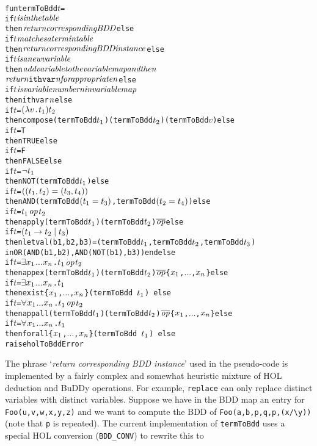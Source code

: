 \documentclass[12pt]{article}
\newcommand{\bnind}[1]{\index[MLbn]{#1}}
\renewcommand{\t}[1]{\mbox{\tt #1}}
\newcommand{\ml}[1]{{\tt #1}}
\newcommand\HOL{HOL\xspace}
\newcommand{\Buddy}{BuDDy\xspace}
\newcommand{\cond}{\rightarrow}
\newcommand{\els}{\mid}
\newcommand{\SP}{~}
\begin{document}
\newpage
{\small\baselineskip12pt\bnind{\ml{termToBdd}}\begin{alltt}
 fun termToBdd \(t\) = 
  if \(t\) \({\it{is in the table}}\)
   then \({\it{return corresponding BDD}}\) else
  if \(t\) \({\it{matches a term in table}}\) 
   then \({\it{return corresponding BDD instance}}\) else 
  if \(t\) \({\it{is a new variable}}\)
   then \({\it{add variable to the variable map and then}}\)
        \({\it{return \t{ithvar} n for appropriate n}}\) else 
  if \(t\) \({\it{is variable number n in variable map}}\)
   then ithvar \({\it{n}}\) else 
  if \(t\) = \(({\lambda}v\t{.} t\sb{1})t\sb{2}\)
   then compose (termToBdd \(t\sb{1}\)) (termToBdd \(t\sb{2}\)) (termToBdd \(v\)) else
  if \(t\) = T
   then TRUE else
  if \(t\) = F
   then FALSE else
  if \(t\) = \(\neg{t\sb{1}}\)
   then NOT(termToBdd \(t\sb{1}\)) else
  if \(t\) = \((({t\sb{1}},{t\sb{2}})=({t\sb{3}},{t\sb{4}}))\) 
   then AND(termToBdd \((t\sb{1}=t\sb{3})\),termToBdd \((t\sb{2}=t\sb{4})\)) else
  if \(t\) = \(t\sb{1}\) \({\it{op}}\) \(t\sb{2}\)
   then apply (termToBdd \(t\sb{1}\)) (termToBdd \(t\sb{2}\)) \(\overline{\it{op}}\) else
  if \(t\) = \((t\sb{1}{}\cond{}t\sb{2}{}\els{}t\sb{3})\)
   then let val (b1,b2,b3) = (termToBdd \(t\sb{1}\),termToBdd \(t\sb{2}\),termToBdd \(t\sb{3}\))
        in OR(AND(b1,b2),AND(NOT(b1),b3)) end else
  if \(t\) = \(\exists\)\(x\sb{1}\) \({\ldots}\) \(x\sb{n}\). \(t\sb{1}\) \({\it{op}}\) \(t\sb{2}\)
   then appex (termToBdd \(t\sb{1}\)) (termToBdd \(t\sb{2}\)) \(\overline{\it{op}}\) \{\(x\sb{1}\),\(\ldots\),\(x\sb{n}\)\} else
  if \(t\) = \(\exists\)\(x\sb{1}\) \({\ldots}\) \(x\sb{n}\). \(t\sb{1}\)
   then exist \{\(x\sb{1}\),\(\ldots\),\(x\sb{n}\)\} (termToBdd\SP\(t\sb{1}\))\SP{}else
  if \(t\) = \(\forall\)\(x\sb{1}\) \({\ldots}\) \(x\sb{n}\). \(t\sb{1}\) \({\it{op}}\) \(t\sb{2}\)
   then appall (termToBdd \(t\sb{1}\)) (termToBdd \(t\sb{2}\)) \(\overline{\it{op}}\) \{\(x\sb{1}\),\(\ldots\),\(x\sb{n}\)\} else
  if \(t\) = \(\forall\)\(x\sb{1}\) \({\ldots}\) \(x\sb{n}\). \(t\sb{1}\)
   then forall \{\(x\sb{1}\),\(\ldots\),\(x\sb{n}\)\} (termToBdd\SP\(t\sb{1}\))\SP{} else
   raise holToBddError
 \end{alltt}}

 
The phrase `{\it{return corresponding BDD instance}}' used in the pseudo-code
is implemented by a fairly complex and somewhat heuristic mixture of \HOL{} deduction and \Buddy{} operations.
For example, \t{replace} can only replace distinct variables with distinct variables. Suppose
we have in the BDD map an entry for \t{Foo(u,v,w,x,y,z)} and we want to compute
the BDD of {\verb+Foo(a,b,p,q,p,(x/\y))+} (note that \t{p} is repeated). The current implementation of
\t{termToBdd} uses a special \HOL{} conversion (\t{BDD\_CONV}) to rewrite this to
\end{document}
